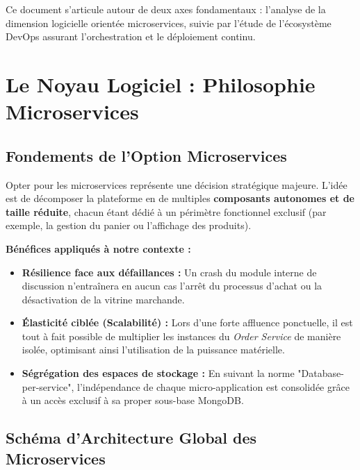 \documentclass[12pt,a4paper]{article}
\begin{document}
Ce document s'articule autour de deux axes fondamentaux : l'analyse de la dimension logicielle orientée microservices, suivie par l'étude de l'écosystème DevOps assurant l'orchestration et le déploiement continu.

\section{Le Noyau Logiciel : Philosophie Microservices}

\subsection{Fondements de l'Option Microservices}
Opter pour les microservices représente une décision stratégique majeure. L'idée est de décomposer la plateforme en de multiples \textbf{composants autonomes et de taille réduite}, chacun étant dédié à un périmètre fonctionnel exclusif (par exemple, la gestion du panier ou l'affichage des produits).

\textbf{Bénéfices appliqués à notre contexte :}
\begin{itemize}
    \item \textbf{Résilience face aux défaillances :} Un crash du module interne de discussion n'entraînera en aucun cas l'arrêt du processus d'achat ou la désactivation de la vitrine marchande.
    \item \textbf{Élasticité ciblée (Scalabilité) :} Lors d'une forte affluence ponctuelle, il est tout à fait possible de multiplier les instances du \textit{Order Service} de manière isolée, optimisant ainsi l'utilisation de la puissance matérielle.
    \item \textbf{Ségrégation des espaces de stockage :} En suivant la norme "Database-per-service", l'indépendance de chaque micro-application est consolidée grâce à un accès exclusif à sa proper sous-base MongoDB.
\end{itemize}

\subsection{Schéma d'Architecture Global des Microservices}
\end{document}
